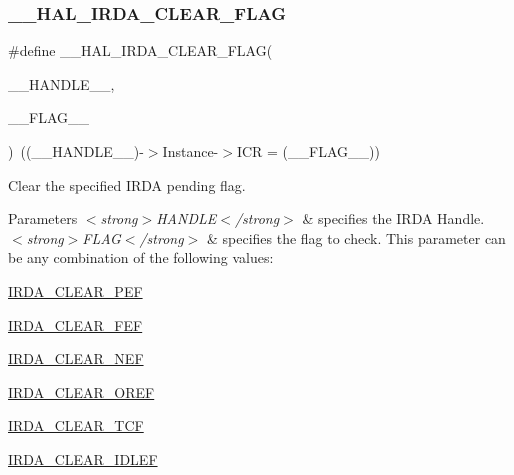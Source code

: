 \subsubsection{\texorpdfstring{\+\_\+\+\_\+\+H\+A\+L\+\_\+\+I\+R\+D\+A\+\_\+\+C\+L\+E\+A\+R\+\_\+\+F\+L\+AG}{\_\_HAL\_IRDA\_CLEAR\_FLAG}}
{\footnotesize\ttfamily \#define \+\_\+\+\_\+\+H\+A\+L\+\_\+\+I\+R\+D\+A\+\_\+\+C\+L\+E\+A\+R\+\_\+\+F\+L\+AG(\begin{DoxyParamCaption}\item[{}]{\+\_\+\+\_\+\+H\+A\+N\+D\+L\+E\+\_\+\+\_\+,  }\item[{}]{\+\_\+\+\_\+\+F\+L\+A\+G\+\_\+\+\_\+ }\end{DoxyParamCaption})~((\+\_\+\+\_\+\+H\+A\+N\+D\+L\+E\+\_\+\+\_\+)-\/$>$Instance-\/$>$I\+CR = (\+\_\+\+\_\+\+F\+L\+A\+G\+\_\+\+\_\+))}



Clear the specified I\+R\+DA pending flag. 


\begin{DoxyParams}{Parameters}
{\em $<$strong$>$\+H\+A\+N\+D\+L\+E$<$/strong$>$} & specifies the I\+R\+DA Handle. \\
\hline
{\em $<$strong$>$\+F\+L\+A\+G$<$/strong$>$} & specifies the flag to check. This parameter can be any combination of the following values\+: \begin{DoxyItemize}
\item \hyperlink{group___i_r_d_a___i_t___c_l_e_a_r___flags_ga1ad61cf6ce6e169e1b7cd9934818bb71}{I\+R\+D\+A\+\_\+\+C\+L\+E\+A\+R\+\_\+\+P\+EF} \item \hyperlink{group___i_r_d_a___i_t___c_l_e_a_r___flags_ga8974fb094f7e7c623ba81aea05de2543}{I\+R\+D\+A\+\_\+\+C\+L\+E\+A\+R\+\_\+\+F\+EF} \item \hyperlink{group___i_r_d_a___i_t___c_l_e_a_r___flags_gab2fec5f35837bc513cb9fa958f482a4f}{I\+R\+D\+A\+\_\+\+C\+L\+E\+A\+R\+\_\+\+N\+EF} \item \hyperlink{group___i_r_d_a___i_t___c_l_e_a_r___flags_gaef356fb07cf820843d8863ee30212a78}{I\+R\+D\+A\+\_\+\+C\+L\+E\+A\+R\+\_\+\+O\+R\+EF} \item \hyperlink{group___i_r_d_a___i_t___c_l_e_a_r___flags_ga90c7c32218dc7e62b918168b147ae268}{I\+R\+D\+A\+\_\+\+C\+L\+E\+A\+R\+\_\+\+T\+CF} \item \hyperlink{group___i_r_d_a___i_t___c_l_e_a_r___flags_ga25e9b5108318d697e308bdc09d1d5597}{I\+R\+D\+A\+\_\+\+C\+L\+E\+A\+R\+\_\+\+I\+D\+L\+EF} \end{DoxyItemize}
\\
\hline
\end{DoxyParams}

